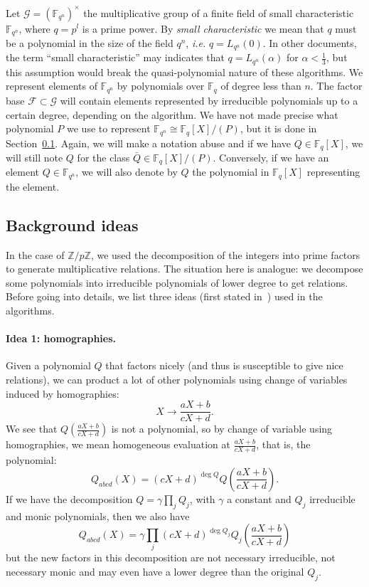 \documentclass[a4paper,11pt]{article}
\theoremstyle{break}
\theoremstyle{sc}
\theoremstyle{definition}
\theoremstyle{remark}
\newcommand{\ie}{\emph{i.e. }}
\begin{document}
Let $\mathcal G = (\mathbb{F}_{q^n})^\times$ the multiplicative group of a finite
field of small characteristic $\mathbb{F}_{q^n}$, where $q=p^l$ is a prime
power. By
\emph{small characteristic} we mean that $q$ must be a polynomial in the size of
the field $q^n$, \ie $q = L_{q^n}(0)$. In other documents, the term ``small
characteristic'' may indicates that $q = L_{q^n}(\alpha)$ for
$\alpha<\frac{1}{3}$, but this assumption would break the quasi-polynomial
nature of these algorithms. We represent elements of
$\mathbb{F}_{q^n}$ by polynomials over $\mathbb{F}_{q}$ of degree less than
$n$. The factor base $\mathcal F\subset\mathcal G$ will contain elements
represented by irreducible polynomials up to a certain degree, depending on the
algorithm. We have not made
precise what polynomial $P$ we use to represent
$\mathbb{F}_{q^n}\cong\mathbb{F}_{q}[X]/(P)$, but it is done
in Section~\ref{ideas}. Again, we will make a notation abuse and if we have
$Q\in \mathbb{F}_{q}[X]$, we will still note $Q$ for the class $\bar Q\in
\mathbb{F}_{q}[X]/(P)$. Conversely, if we have an element $Q\in
\mathbb{F}_{q^{n}}$, we
will also denote by $Q$ the polynomial in $\mathbb{F}_{q}[X]$ representing the
element.

\subsection{Background ideas}
\label{ideas}

In the case of $\mathbb{Z}/p\mathbb{Z}$, we used the decomposition of the
integers into prime factors to generate multiplicative relations. The situation
here is analogue: we decompose some polynomials into irreducible polynomials of
lower degree to get relations. Before going into details, we list three ideas
(first stated in~\cite{Joux13}) used in the algorithms.

\paragraph{Idea 1: homographies.} Given a polynomial $Q$ that factors nicely
(and thus is susceptible to give nice relations), we can product a lot of other
polynomials using change of variables induced by homographies:
\[
  X\to\frac{aX+b}{cX+d}.
\]
We see that $Q(\frac{aX+b}{cX+d})$ is not a polynomial, so by change of variable
using homographies, we mean homogeneous evaluation at $\frac{aX+b}{cX+d}$,
that is, the polynomial:
\[
  Q_{abcd}(X) = (cX+d)^{\deg Q}Q\left(\frac{aX+b}{cX+d} \right).
\]
If we have the decomposition $Q=\gamma\prod_j Q_j$, with $\gamma$ a constant and
$Q_j$ irreducible and monic polynomials, then we also have
\[
  Q_{abcd}(X) = \gamma\prod_j (cX+d)^{\deg Q_j}Q_j(\frac{aX+b}{cX+d})
\]
but the new factors in this decomposition are not necessary irreducible, not
necessary monic and may even have a lower degree than the original $Q_j$.
\end{document}
